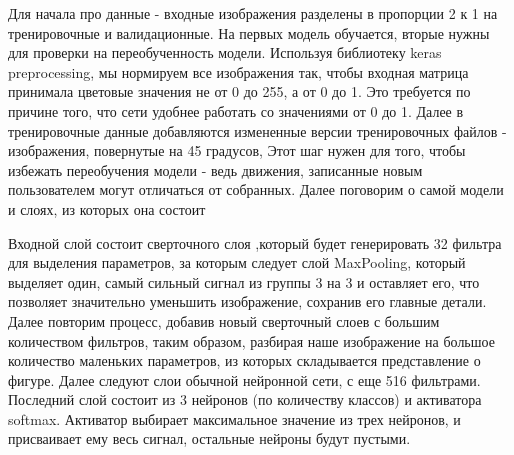 Для начала про данные - входные изображения разделены в пропорции 2 к 1 на тренировочные и валидационные. На первых модель обучается, вторые нужны для проверки на переобученность модели. 
Используя библиотеку keras preprocessing, мы нормируем все изображения так, чтобы входная матрица принимала цветовые значения не от 0 до 255, а от 0 до 1. Это требуется по причине того, что сети удобнее работать со значениями от 0 до 1. Далее в тренировочные данные добавляются измененные версии тренировочных файлов - изображения, повернутые на 45 градусов, Этот шаг нужен для того, чтобы избежать переобучения модели - ведь движения, записанные новым пользователем могут отличаться от собранных. 
Далее поговорим о самой модели и слоях, из которых она состоит
\begin{figure}[H]
\end{figure}
Входной слой состоит сверточного слоя ,который будет генерировать 32 фильтра для выделения параметров, за которым следует слой MaxPooling, который выделяет один, самый сильный сигнал из группы 3 на 3 и оставляет его, что позволяет значительно уменьшить изображение, сохранив его главные детали.  Далее повторим процесс, добавив новый сверточный слоев с большим количеством фильтров, таким образом, разбирая наше изображение на большое количество маленьких параметров, из которых складывается представление о фигуре.
Далее следуют слои обычной нейронной сети, с еще 516 фильтрами.
Последний слой состоит из 3 нейронов (по количеству классов) и активатора softmax. Активатор выбирает максимальное значение из трех нейронов, и присваивает ему весь сигнал, остальные нейроны будут пустыми. 

